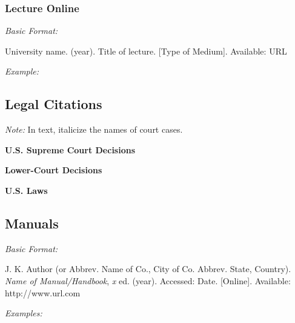 \documentclass[10pt]{article}
\newcommand*{\guidelabel}[1]{\par\vspace{-4pt}\hspace*{22pt}\textit{#1}\par\vspace{-\parskip}}
\begin{document}
\subsubsection{Lecture Online}
\guidelabel{Basic Format:}
\begin{guideitems}
  \item University name. (year). Title of lecture. [Type of Medium]. Available: URL
\end{guideitems}
\guidelabel{Example:}
\begin{guideitems}
  \item {}
\end{guideitems}

\subsection{Legal Citations}

\textit{Note:} In text, italicize the names of court cases.

\textbf{U.S. Supreme Court Decisions}

\begin{guideitems}
  \item {}
  \item {}
\end{guideitems}

\textbf{Lower-Court Decisions}

\begin{guideitems}
  \item {}
  \item {}
\end{guideitems}

\textbf{U.S. Laws}

\begin{guideitems}
  \item {}
  \item {}
  \item {}
\end{guideitems}

\subsection{Manuals}
\guidelabel{Basic Format:}
\begin{guideitems}
  \item J. K. Author (or Abbrev. Name of Co., City of Co. Abbrev. State, Country). \textit{Name of Manual/Handbook}, \textit{x} ed. (year). Accessed: Date. [Online]. Available: http://www.url.com
\end{guideitems}
\guidelabel{Examples:}
\begin{guideitems}
  \item {}
  \item {}
  \item {}
\end{guideitems}
\end{document}
